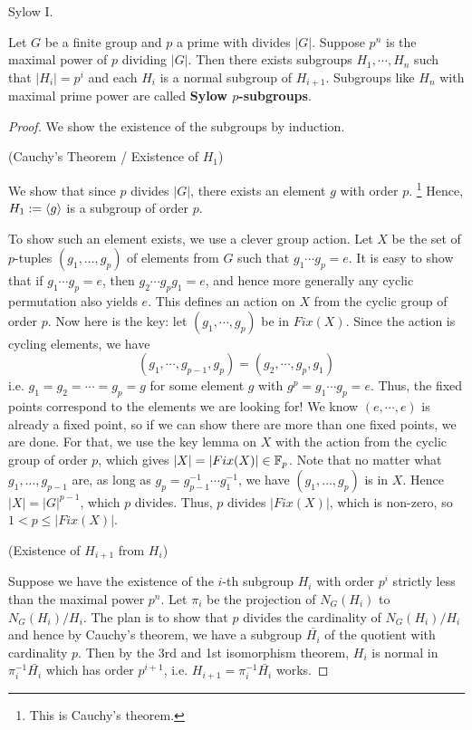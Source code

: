\documentclass[../../book.tex]{subfiles}
\begin{document}
\begin{thm} Sylow I. 
    
    Let $G$ be a finite group and $p$ a prime with divides $|G|$. 
    Suppose $p^n$ is the maximal power of $p$ dividing $|G|$. 
    Then there exists subgroups $H_1, \cdots, H_n$ such that
    $|H_i| = p^i$ and each $H_i$ is a normal subgroup of $H_{i+1}$. 
    Subgroups like $H_n$ with maximal prime power are called 
    \textbf{Sylow $p$-subgroups}.
    
\end{thm}
\begin{proof}
    
    We show the existence of the subgroups by induction. 
    
    (Cauchy's Theorem / Existence of $H_1$)
    
    We show that since $p$ divides $|G|$, 
    there exists an element $g$ with order $p$.
    \footnote{This is Cauchy's theorem.}
    Hence, $H_1 := \langle g\rangle$ is a subgroup of order $p$.  
    
    To show such an element exists, we use a clever group action. 
    Let $X$ be the set of $p$-tuples $(g_1,\dots,g_p)$ of elements from $G$ 
    such that $g_1\cdots g_p = e$. 
    It is easy to show that if $g_1 \cdots g_p = e$, then $g_2 \cdots g_p g_1 = e$,
    and hence more generally any cyclic permutation also yields $e$. 
    This defines an action on $X$ from the cyclic group of order $p$. 
    Now here is the key: let $(g_1,\cdots,g_p)$ be in $Fix(X)$. 
    Since the action is cycling elements, we have \[
        (g_1,\cdots,g_{p-1},g_p) = (g_2,\cdots,g_p,g_1)
    \]
    i.e. $g_1 = g_2 = \cdots = g_p = g$ for some element $g$ 
    with $g^p = g_1\cdots g_p = e$. 
    Thus, the fixed points correspond to the elements we are looking for! 
    We know $(e,\cdots,e)$ is already a fixed point, 
    so if we can show there are more than one fixed points, we are done. 
    For that, we use the key lemma on 
    $X$ with the action from the cyclic group of order $p$,
    which gives $|X| = |Fix(X)| \in \mathbb{F}_p$. 
    Note that no matter what $g_1,\dots,g_{p-1}$ are, 
    as long as $g_p = g_{p-1}^{-1}\cdots g_1^{-1}$,
    we have $(g_1,\dots,g_p)$ is in $X$. 
    Hence $|X| = |G|^{p-1}$, which $p$ divides.
    Thus, $p$ divides $|Fix(X)|$, which is non-zero, so $1 < p \leq |Fix(X)|$. 
    
    (Existence of $H_{i+1}$ from $H_i$)
    
    Suppose we have the existence of the $i$-th subgroup $H_i$
    with order $p^i$ strictly less than the maximal power $p^n$. 
    Let $\pi_i$ be the projection of $N_G(H_i)$ to $N_G(H_i) / H_i$.
    The plan is to show that $p$ divides the cardinality of $N_G(H_i) / H_i$
    and hence by Cauchy's theorem, 
    we have a subgroup $\bar{H_i}$ of the quotient with cardinality $p$. 
    Then by the 3rd and 1st isomorphism theorem, 
    $H_i$ is normal in $\pi_i^{-1}\bar{H_i}$ which has order $p^{i+1}$,
    i.e. $H_{i+1} = \pi_i^{-1}\bar{H_i}$ works. 
    

\end{proof}
\end{document}
